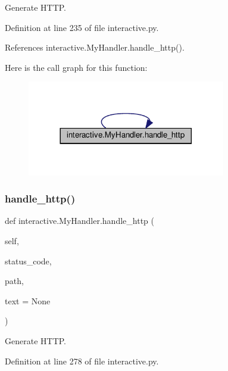 \begin{DoxyVerb}Generate HTTP.\end{DoxyVerb}
 

Definition at line 235 of file interactive.\+py.



References interactive.\+My\+Handler.\+handle\+\_\+http().

Here is the call graph for this function\+:
\nopagebreak
\begin{figure}[H]
\begin{center}
\leavevmode
\includegraphics[width=245pt]{classinteractive_1_1MyHandler_a5941a3caf26e4d5931324edbdbf51f8b_cgraph}
\end{center}
\end{figure}
\mbox{\label{classinteractive_1_1MyHandler_a5941a3caf26e4d5931324edbdbf51f8b}} 
\subsubsection{\texorpdfstring{handle\+\_\+http()}{handle\_http()}\hspace{0.1cm}{\footnotesize\ttfamily [2/2]}}
{\footnotesize\ttfamily def interactive.\+My\+Handler.\+handle\+\_\+http (\begin{DoxyParamCaption}\item[{}]{self,  }\item[{}]{status\+\_\+code,  }\item[{}]{path,  }\item[{}]{text = {\ttfamily None} }\end{DoxyParamCaption})}

\begin{DoxyVerb}Generate HTTP.\end{DoxyVerb}
 

Definition at line 278 of file interactive.\+py.



